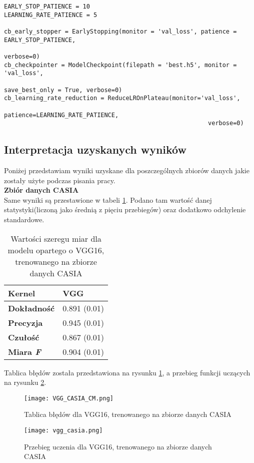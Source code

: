 \begin{lstlisting}[caption={Funkcje sterujące procesem uczenia}, label={lst:call}]
EARLY_STOP_PATIENCE = 10
LEARNING_RATE_PATIENCE = 5

cb_early_stopper = EarlyStopping(monitor = 'val_loss', patience = EARLY_STOP_PATIENCE,
								 								verbose=0)
cb_checkpointer = ModelCheckpoint(filepath = 'best.h5', monitor = 'val_loss', 
																	save_best_only = True, verbose=0)
cb_learning_rate_reduction = ReduceLROnPlateau(monitor='val_loss', 
														 patience=LEARNING_RATE_PATIENCE, 
														 verbose=0)
\end{lstlisting}

\subsection{Interpretacja uzyskanych wyników}

Poniżej przedstawiam wyniki uzyskane dla poszczególnych zbiorów danych jakie zostały użyte podczas pisania pracy.\\

\textbf{Zbiór danych CASIA} \\

Same wyniki są przestawione w tabeli \ref{tab:result_vgg}. Podano tam wartość danej statystyki(liczoną jako średnią z pięciu przebiegów) oraz dodatkowo odchylenie standardowe.
\begin{table}[h!]
	\centering
	\begin{tabular}{|l|l|}
		\hline
		\textbf{Kernel}     & VGG          \\ \hline
		\textbf{Dokładność} & 0.891 (0.01) \\ \hline
		\textbf{Precyzja}   & 0.945 (0.01) \\ \hline
		\textbf{Czułość}    & 0.867 (0.01) \\ \hline
		\textbf{Miara \textit{F}}    & 0.904 (0.01) \\ \hline
	\end{tabular}
	\caption{Wartości szeregu miar dla modelu opartego o VGG16, trenowanego na zbiorze danych CASIA}
	\label{tab:result_vgg}
\end{table}

Tablica błędów została przedstawiona na rysunku \ref{fig:vgg_cm_casia}, a przebieg funkcji uczących na rysunku \ref{fig:vgg_learn_casia}. \\
\begin{figure}[h!]
	\texttt{[image: VGG\_CASIA\_CM.png]}
	\centering
	\caption{Tablica błędów dla VGG16, trenowanego na zbiorze danych CASIA}
	\label{fig:vgg_cm_casia}
\end{figure}
\begin{figure}[h!]
	\texttt{[image: vgg\_casia.png]}
	\centering
	\caption{Przebieg uczenia dla VGG16, trenowanego na zbiorze danych CASIA}
	\label{fig:vgg_learn_casia}
\end{figure}

